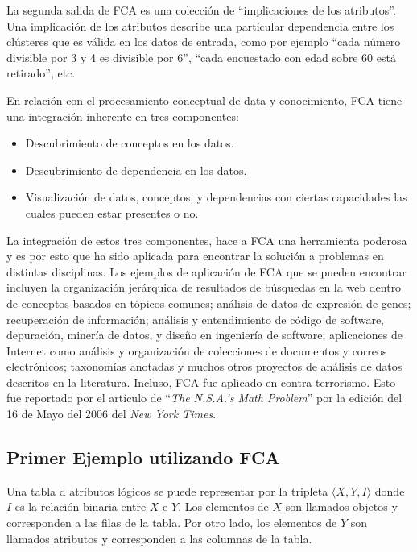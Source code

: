 \documentclass[12pt,oneside,letterpaper]{book}
\newcommand{\eng}[1]{\textit{#1}\xspace}			%
\newcommand{\abr}[1]{\textsc{#1}\xspace}           %
\theoremstyle{definition}
\begin{document}
La segunda salida de \abr{FCA} es una colección de ``implicaciones de los atributos''. Una implicación de los atributos describe una particular dependencia entre los clústeres que es válida en los datos de entrada, como por ejemplo ``cada número divisible por 3 y 4 es divisible por 6'', ``cada encuestado con edad sobre 60 está retirado'', etc.

En relación con el procesamiento conceptual de data y conocimiento, \abr{FCA} tiene una integración inherente en tres componentes:
\begin{itemize}
	\item Descubrimiento de conceptos en los datos.
	\item Descubrimiento de dependencia en los datos.
	\item Visualización de datos, conceptos, y dependencias con ciertas capacidades las cuales pueden estar presentes o no.
\end{itemize}

La integración de estos tres componentes, hace a \abr{FCA} una herramienta poderosa y es por esto que ha sido aplicada para encontrar la solución a problemas en distintas disciplinas. Los ejemplos de aplicación de \abr{FCA} que se pueden encontrar incluyen la organización jerárquica de resultados de búsquedas en la web dentro de conceptos basados en tópicos comunes; análisis de datos de expresión de genes; recuperación de información; análisis y entendimiento de código de software, depuración, minería de datos, y diseño en ingeniería de software; aplicaciones de Internet como análisis y organización de colecciones de documentos y correos electrónicos; taxonomías anotadas y muchos otros proyectos de análisis de datos descritos en la literatura. Incluso, \abr{FCA} fue aplicado en contra-terrorismo. Esto fue reportado por el artículo de ``\eng{The N.S.A.’s Math Problem}'' por la edición del 16 de Mayo del 2006 del \eng{New York Times}.

\subsection{Primer Ejemplo utilizando \abr{FCA}} %
\label{sub:primer_ejemplo}
Una tabla d atributos lógicos se puede representar por la tripleta $\langle X,Y,I \rangle$ donde $I$ es la relación binaria entre $X$ e $Y$. Los elementos de $X$ son llamados objetos y corresponden a las filas de la tabla. Por otro lado, los elementos de $Y$ son llamados atributos y corresponden a las columnas de la tabla.
\end{document}
